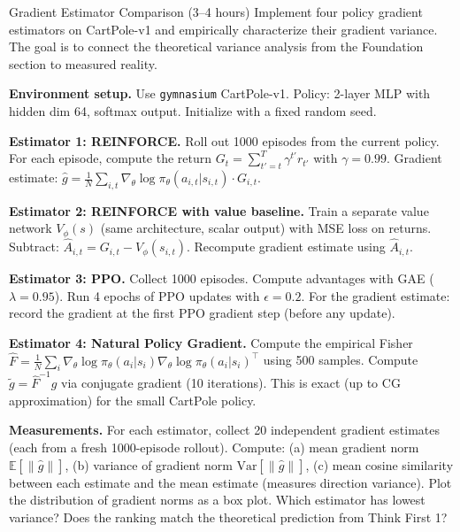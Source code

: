 \begin{exercise}{Gradient Estimator Comparison (3--4 hours)}
Implement four policy gradient estimators on CartPole-v1 and empirically characterize their gradient variance. The goal is to connect the theoretical variance analysis from the Foundation section to measured reality.

\textbf{Environment setup.} Use \texttt{gymnasium} CartPole-v1. Policy: 2-layer MLP with hidden dim 64, softmax output. Initialize with a fixed random seed.

\textbf{Estimator 1: REINFORCE.} Roll out 1000 episodes from the current policy. For each episode, compute the return $G_t = \sum_{t'=t}^{T} \gamma^{t'} r_{t'}$ with $\gamma = 0.99$. Gradient estimate: $\hat{g} = \frac{1}{N}\sum_{i,t} \nabla_\theta \log \pi_\theta(a_{i,t}|s_{i,t}) \cdot G_{i,t}$.

\textbf{Estimator 2: REINFORCE with value baseline.} Train a separate value network $V_\phi(s)$ (same architecture, scalar output) with MSE loss on returns. Subtract: $\hat{A}_{i,t} = G_{i,t} - V_\phi(s_{i,t})$. Recompute gradient estimate using $\hat{A}_{i,t}$.

\textbf{Estimator 3: PPO.} Collect 1000 episodes. Compute advantages with GAE ($\lambda = 0.95$). Run 4 epochs of PPO updates with $\epsilon = 0.2$. For the gradient estimate: record the gradient at the first PPO gradient step (before any update).

\textbf{Estimator 4: Natural Policy Gradient.} Compute the empirical Fisher $\hat{F} = \frac{1}{N}\sum_i \nabla_\theta \log \pi_\theta(a_i|s_i) \nabla_\theta \log \pi_\theta(a_i|s_i)^\top$ using 500 samples. Compute $\tilde{g} = \hat{F}^{-1} g$ via conjugate gradient (10 iterations). This is exact (up to CG approximation) for the small CartPole policy.

\textbf{Measurements.} For each estimator, collect 20 independent gradient estimates (each from a fresh 1000-episode rollout). Compute: (a) mean gradient norm $\mathbb{E}[\|\hat{g}\|]$, (b) variance of gradient norm $\mathrm{Var}[\|\hat{g}\|]$, (c) mean cosine similarity between each estimate and the mean estimate (measures direction variance). Plot the distribution of gradient norms as a box plot. Which estimator has lowest variance? Does the ranking match the theoretical prediction from Think First 1?
\end{exercise}

